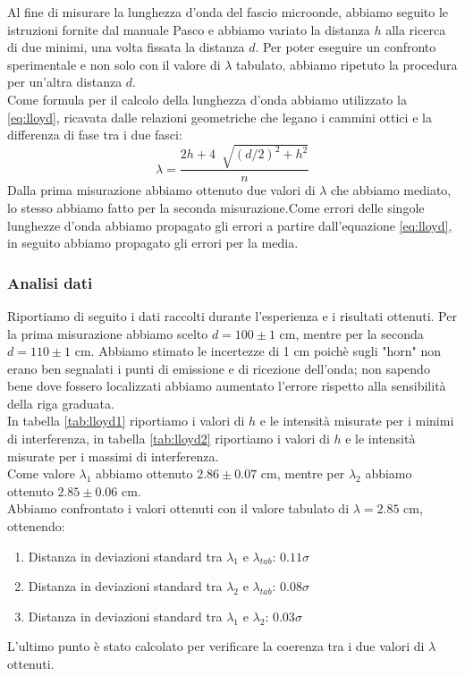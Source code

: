 \documentclass[letterpaper,12pt]{article}
\begin{document}
Al fine di misurare la lunghezza d'onda del fascio microonde, abbiamo seguito le istruzioni fornite dal manuale
Pasco e abbiamo variato la distanza $h$ alla ricerca di due minimi, una volta fissata la distanza $d$. 
Per poter eseguire un confronto sperimentale e non solo con il valore di $\lambda$ tabulato, 
abbiamo ripetuto la procedura per un'altra distanza $d$. \\
Come formula per il calcolo della lunghezza d'onda abbiamo utilizzato la \ref{eq:lloyd}, ricavata dalle relazioni 
geometriche che legano i cammini ottici e la differenza di fase tra i due fasci:
\begin{equation}
	\lambda = \frac{2h + 4\ \sqrt[]{(d/2)^2 + h^2}}{n}
	\label{eq:lloyd}
\end{equation}
Dalla prima misurazione abbiamo ottenuto due valori di $\lambda$ che abbiamo mediato, lo stesso abbiamo fatto per
la seconda misurazione.Come errori delle singole lunghezze d'onda abbiamo propagato gli errori a partire dall'equazione
\ref{eq:lloyd}, in seguito abbiamo propagato gli errori per la media. \\


\subsubsection{Analisi dati}
Riportiamo di seguito i dati raccolti durante l'esperienza e i risultati ottenuti.
Per la prima misurazione abbiamo scelto $d = 100 \pm 1$ cm, mentre per la seconda $d = 110 \pm 1$ cm. Abbiamo 
stimato le incertezze di 1 cm poichè sugli "horn" non erano ben segnalati i punti di emissione e di ricezione
dell'onda; non sapendo bene dove fossero localizzati abbiamo aumentato l'errore rispetto alla sensibilità 
della riga graduata.\\
In tabella \ref{tab:lloyd1} riportiamo i valori di $h$ e le intensità misurate per i minimi di interferenza,
in tabella \ref{tab:lloyd2} riportiamo i valori di $h$ e le intensità misurate per i massimi di interferenza.\\
Come valore $\lambda_1$ abbiamo ottenuto $2.86 \pm 0.07$ cm, mentre per $\lambda_2$ abbiamo ottenuto $2.85 \pm 0.06$ cm.\\
Abbiamo confrontato i valori ottenuti con il valore tabulato di $\lambda = 2.85$ cm, ottenendo:
\begin{enumerate}
	\item Distanza in deviazioni standard tra $\lambda_1$ e $\lambda_{tab}$: $0.11 \sigma$
	\item Distanza in deviazioni standard tra $\lambda_2$ e $\lambda_{tab}$: $0.08 \sigma$
	\item Distanza in deviazioni standard tra $\lambda_1$ e $\lambda_2$: $0.03 \sigma$
\end{enumerate}
L'ultimo punto è stato calcolato per verificare la coerenza tra i due valori di $\lambda$ ottenuti.\\
\end{document}

